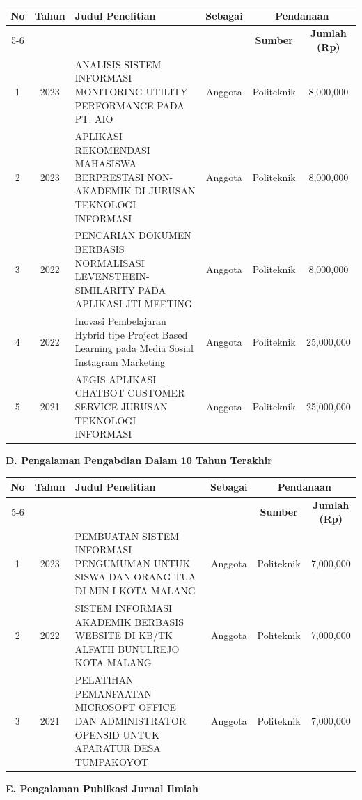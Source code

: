 {\footnotesize
\begin{longtable}{|c|c|p{6.5cm}|c|c|c|}
\hline
\textbf{No} & \textbf{Tahun} & \textbf{Judul Penelitian} & \textbf{Sebagai} & \multicolumn{2}{c|}{\textbf{Pendanaan}} \\
\cline{5-6}
& & & & \textbf{Sumber} & \textbf{Jumlah (Rp)} \\
\hline
1 & 2023 & ANALISIS SISTEM INFORMASI MONITORING UTILITY PERFORMANCE PADA PT. AIO & Anggota & Politeknik & 8,000,000 \\
\hline
2 & 2023 & APLIKASI REKOMENDASI MAHASISWA BERPRESTASI NON-AKADEMIK DI JURUSAN TEKNOLOGI INFORMASI & Anggota & Politeknik & 8,000,000 \\
\hline
3 & 2022 & PENCARIAN DOKUMEN BERBASIS NORMALISASI LEVENSTHEIN-SIMILARITY PADA APLIKASI JTI MEETING & Anggota & Politeknik & 8,000,000 \\
\hline
4 & 2022 & Inovasi Pembelajaran Hybrid tipe Project Based Learning pada Media Sosial Instagram Marketing & Anggota & Politeknik & 25,000,000 \\
\hline
5 & 2021 & AEGIS APLIKASI CHATBOT CUSTOMER SERVICE JURUSAN TEKNOLOGI INFORMASI & Anggota & Politeknik & 25,000,000 \\
\hline
\end{longtable}
}

\textbf{D. Pengalaman Pengabdian Dalam 10 Tahun Terakhir}

{\footnotesize
\begin{longtable}{|c|c|p{6.5cm}|c|c|c|}
\hline
\textbf{No} & \textbf{Tahun} & \textbf{Judul Penelitian} & \textbf{Sebagai} & \multicolumn{2}{c|}{\textbf{Pendanaan}} \\
\cline{5-6}
& & & & \textbf{Sumber} & \textbf{Jumlah (Rp)} \\
\hline
1 & 2023 & PEMBUATAN SISTEM INFORMASI PENGUMUMAN UNTUK SISWA DAN ORANG TUA DI MIN I KOTA MALANG & Anggota & Politeknik & 7,000,000 \\
\hline
2 & 2022 & SISTEM INFORMASI AKADEMIK BERBASIS WEBSITE DI KB/TK ALFATH BUNULREJO KOTA MALANG & Anggota & Politeknik & 7,000,000 \\
\hline
3 & 2021 & PELATIHAN PEMANFAATAN MICROSOFT OFFICE DAN ADMINISTRATOR OPENSID UNTUK APARATUR DESA TUMPAKOYOT & Anggota & Politeknik & 7,000,000 \\
\hline
\end{longtable}
}

\textbf{E. Pengalaman Publikasi Jurnal Ilmiah}

